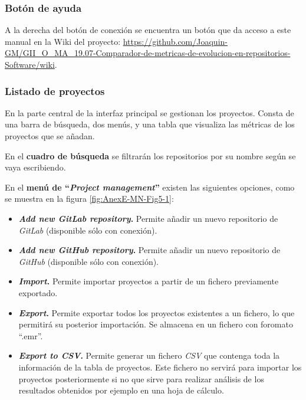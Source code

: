 \newpage
\subsubsection{Botón de ayuda}
A la derecha del botón de conexión se encuentra un botón que da acceso a este manual en la Wiki del proyecto: \url{https://github.com/Joaquin-GM/GII_O_MA_19.07-Comparador-de-metricas-de-evolucion-en-repositorios-Software/wiki}.

\subsubsection{Listado de proyectos}
En la parte central de la interfaz principal se gestionan los proyectos. Consta de una barra de búsqueda, dos menús, y una tabla que visualiza las métricas de los proyectos que se añadan.

En el \textbf{cuadro de búsqueda} se filtrarán los repositorios por su nombre según se vaya escribiendo.

En el \textbf{menú de ``\textit{Project management}''} existen las siguientes opciones, como se muestra en la figura \ref{fig:AnexE-MN-Fig5-1}:
\begin{itemize}
	\item \textbf{\textit{Add new GitLab repository}.} Permite añadir un nuevo repositorio de \textit{GitLab} (disponible sólo con conexión). 
	
	\item \textbf{\textit{Add new GitHub repository}.} Permite añadir un nuevo repositorio de \textit{GitHub} (disponible sólo con conexión). 
	
	\item \textbf{\textit{Import}.} Permite importar proyectos a partir de un fichero previamente exportado.
	
	\item \textbf{\textit{Export}.} Permite exportar todos los proyectos existentes a un fichero, lo que permitirá su posterior importación. Se almacena en un fichero con foromato ``.emr''.
	
	\item \textbf{\textit{Export to CSV}.} Permite generar un fichero \textit{CSV} que contenga toda la información de la tabla de proyectos. Este fichero no servirá para importar los proyectos posteriormente si no que sirve para realizar análisis de los resultados obtenidos por ejemplo en una hoja de cálculo.
\end{itemize}

